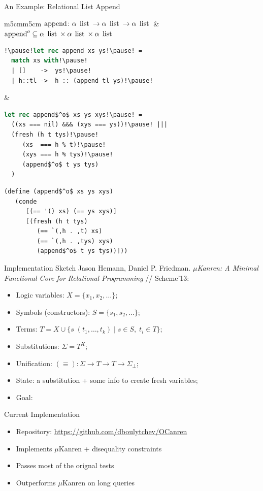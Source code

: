 \documentclass[10pt, mathserif]{beamer}
\let\\\tabularnewline
\let\\\tabularnewline
\newcommand{\oo}[1]{{#1}^o}
\newcommand{\inml}[1]{\mbox{\lstinline{#1}}}
\newcommand{\graybox}[1]{\colorbox{light-gray}{#1}}
\theoremstyle{definition}
\begin{document}
\begin{frame}[fragile]{An Example: Relational List Append}
\vskip5mm
\begin{tabular}{m{5cm}m{5cm}}
 \graybox{$\inml{append} \colon \alpha\:\inml{list} \to \alpha\:\inml{list} \to \alpha\:\inml{list}$} &
 \graybox{$\oo{\inml{append}} \subseteq \alpha\:\inml{list} \times \alpha\:\inml{list} \times \alpha\:\inml{list}$}\\
 \begin{lstlisting}[language=ocaml] 
!\pause!let rec append xs ys!\pause! = 
  match xs with!\pause!
  | []    ->  ys!\pause!
  | h::tl ->  h :: (append tl ys)!\pause!
 \end{lstlisting} &
 \begin{lstlisting}[mathescape=true,language=ocaml]
let rec append$^o$ xs ys xys!\pause! = 
  ((xs === nil) &&& (xys === ys))!\pause! |||  
  (fresh (h t tys)!\pause!
     (xs  === h % t)!\pause! 
     (xys === h % tys)!\pause!
     (append$^o$ t ys tys)
  ) 
 \end{lstlisting}
\end{tabular}\pause
\begin{center}
\begin{minipage}{6cm}
\begin{lstlisting}[mathescape=true,language=scheme]
(define (append$^o$ xs ys xys) 
   (conde 
      [(== '() xs) (== ys xys)]
      [(fresh (h t tys)
         (== `(,h . ,t) xs)
         (== `(,h . ,tys) xys)
         (append$^o$ t ys tys))]))
\end{lstlisting}
\end{minipage}
\end{center}
\vskip5mm
\end{frame}

\begin{frame}[fragile]{Implementation Sketch}
Jason Hemann, Daniel P. Friedman. \emph{$\mu$Kanren: A Minimal Functional 
Core for Relational Programming} // Scheme'13:

\begin{itemize}
\item Logic variables: $X=\{x_1,x_2,\dots\}$;
\item Symbols (constructors): $S=\{s_1,s_2,\dots\}$;
\item Terms: $T=X\cup\{s\;(t_1,\dots,t_k)\mid s\in S,\; t_i \in T\}$;
\item Substitutions: $\Sigma=T^X$;
\item Unification: $(\equiv) \colon \Sigma \to T \to T \to \Sigma_\perp$;
\item State: a substitution + some info to create fresh variables;
\item Goal: 
\end{itemize}

\end{frame}

\begin{frame}[fragile]{Current Implementation}

\begin{itemize}
\item Repository: \url{https://github.com/dboulytchev/OCanren}
\item Implements $\mu$Kanren + disequality constraints
\item Passes most of the orignal tests
\item Outperforms $\mu$Kanren on long queries
\end{itemize}

\end{frame}
\end{document}
